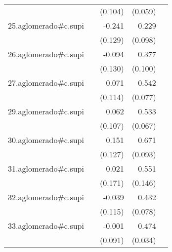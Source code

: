 {\begin{longtable}{l*{4}{D{.}{.}{-1}}}
            &                     &     (0.104)         &     (0.059)         &                     \\
\addlinespace
25.aglomerado#c.supi&                     &      -0.241         &       0.229\sym{*}  &                     \\
            &                     &     (0.129)         &     (0.098)         &                     \\
\addlinespace
26.aglomerado#c.supi&                     &      -0.094         &       0.377\sym{***}&                     \\
            &                     &     (0.130)         &     (0.100)         &                     \\
\addlinespace
27.aglomerado#c.supi&                     &       0.071         &       0.542\sym{***}&                     \\
            &                     &     (0.114)         &     (0.077)         &                     \\
\addlinespace
29.aglomerado#c.supi&                     &       0.062         &       0.533\sym{***}&                     \\
            &                     &     (0.107)         &     (0.067)         &                     \\
\addlinespace
30.aglomerado#c.supi&                     &       0.151         &       0.671\sym{***}&                     \\
            &                     &     (0.127)         &     (0.093)         &                     \\
\addlinespace
31.aglomerado#c.supi&                     &       0.021         &       0.551\sym{***}&                     \\
            &                     &     (0.171)         &     (0.146)         &                     \\
\addlinespace
32.aglomerado#c.supi&                     &      -0.039         &       0.432\sym{***}&                     \\
            &                     &     (0.115)         &     (0.078)         &                     \\
\addlinespace
33.aglomerado#c.supi&                     &      -0.001         &       0.474\sym{***}&                     \\
            &                     &     (0.091)         &     (0.034)         &                     \\

\end{longtable}}
